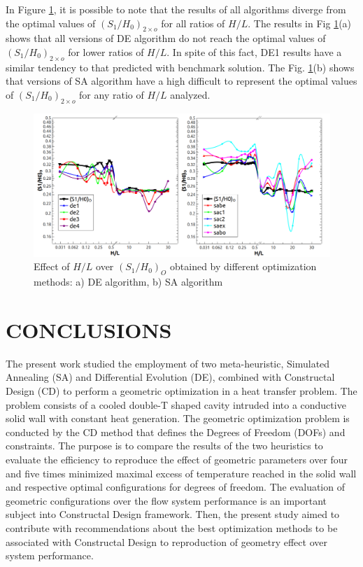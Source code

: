 \documentclass[12pt,fleqn]{article}
\begin{document}
In Figure \ref{figure08}, it is possible to note that the results of all algorithms diverge from the optimal values of ${(S_{1}/H_{0})_{2\times o}}$ for all ratios of $H/L$. The results in Fig \ref{figure08}(a) shows that all versions of DE algorithm do not reach the optimal values of ${(S_{1}/H_{0})_{2\times o}}$ for lower ratios of  $H/L$. In spite of this fact, DE1 results have a similar tendency to that predicted with benchmark solution. The Fig. \ref{figure08}(b) shows that versions of SA algorithm have a high difficult to represent the optimal values of ${(S_{1}/H_{0})_{2\times o}}$ for any ratio of  $H/L$ analyzed.
\begin{figure}[H]
\centering
\includegraphics[width=0.9\linewidth]{imgs/5dof/de_sa_hl_s1h0.png}
\caption{ {\small Effect of $H/L$ over ${(S_{1}/H_{0})_{O}}$ obtained by different optimization methods: a) DE algorithm, b) SA algorithm}}
\label{figure08}
\end{figure}

\section{CONCLUSIONS}

The present work studied the employment of two meta-heuristic, Simulated Annealing (SA) and Differential Evolution (DE), combined with Constructal Design (CD) to perform a geometric optimization in a heat transfer problem. The problem consists of a cooled double-T shaped cavity intruded into a conductive solid wall with constant heat generation. The geometric optimization problem is conducted by the CD method that defines the Degrees of Freedom (DOFs) and constraints. The purpose is to compare the results of the two heuristics to evaluate the efficiency to reproduce the effect of geometric parameters over four and five times minimized maximal excess of temperature reached in the solid wall and respective optimal configurations for degrees of freedom. The evaluation of geometric configurations over the flow system performance is an important subject into Constructal Design framework. Then, the present study aimed to contribute with recommendations about the best optimization methods to be associated with Constructal Design to reproduction of geometry effect over system performance.
\end{document}
